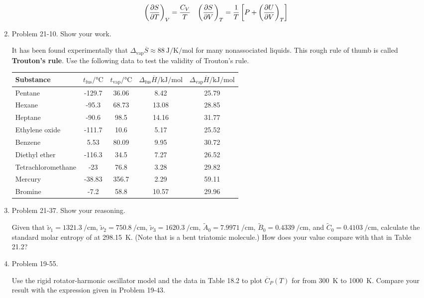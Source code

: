 \documentclass[../psets.tex]{subfiles}
\begin{document}
\begin{enumerate}
    \begin{align*}
        \left( \pdv{S}{T} \right)_V &= \frac{C_V}{T}&
        \left( \pdv{S}{V} \right)_T &= \frac{1}{T}\left[ P+\left( \pdv{U}{V} \right)_T \right]
    \end{align*}
    \item Problem 21-10. Show your work.\par
    It has been found experimentally that $\Delta_\text{vap}\overline{S}\approx\SI{88}{\joule\per\kelvin\per\mole}$ for many nonassociated liquids. This rough rule of thumb is called \textbf{Trouton's rule}. Use the following data to test the validity of Trouton's rule.
    \begin{center}
        \small
        \renewcommand{\arraystretch}{1.2}
        \begin{tabular}{
            l
            c
            S[table-format=3.2]
            S[table-format=2.2]
            S[table-format=2.2]
        }
            \toprule
            Substance & {$t_\text{fus}/\si{\celsius}$} & {$t_\text{vap}/\si{\celsius}$} & {$\Delta_\text{fus}\overline{H}/\si{\kilo\joule\per\mole}$} & {$\Delta_\text{vap}\overline{H}/\si{\kilo\joule\per\mole}$}\\
            \midrule
            Pentane            & -129.7 & 36.06 & 8.42  & 25.79\\
            Hexane             & -95.3  & 68.73 & 13.08 & 28.85\\
            Heptane            & -90.6  & 98.5  & 14.16 & 31.77\\
            Ethylene oxide     & -111.7 & 10.6  & 5.17  & 25.52\\
            Benzene            & 5.53   & 80.09 & 9.95  & 30.72\\
            Diethyl ether      & -116.3 & 34.5  & 7.27  & 26.52\\
            Tetrachloromethane & -23    & 76.8  & 3.28  & 29.82\\
            Mercury            & -38.83 & 356.7 & 2.29  & 59.11\\
            Bromine            & -7.2   & 58.8  & 10.57 & 29.96\\
            \bottomrule
        \end{tabular}
    \end{center}
    \item Problem 21-37. Show your reasoning.\par
    Given that $\tilde{\nu}_1=\SI{1321.3}{\per\centi\meter}$, $\tilde{\nu}_2=\SI{750.8}{\per\centi\meter}$, $\tilde{\nu}_3=\SI{1620.3}{\per\centi\meter}$, $\tilde{A}_0=\SI{7.9971}{\per\centi\meter}$, $\tilde{B}_0=\SI{0.4339}{\per\centi\meter}$, and $\tilde{C}_0=\SI{0.4103}{\per\centi\meter}$, calculate the standard molar entropy of  at \SI{298.15}{\kelvin}. (Note that  is a bent triatomic molecule.) How does your value compare with that in Table 21.2?
    \item Problem 19-55.\par
    Use the rigid rotator-harmonic oscillator model and the data in Table 18.2 to plot $\overline{C}_P(T)$ for  from \SI{300}{\kelvin} to \SI{1000}{\kelvin}. Compare your result with the expression given in Problem 19-43.
\end{enumerate}
\end{document}
